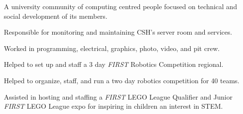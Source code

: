 \cvtag{\LaTeX}



\medskip
{}
A university community of computing centred people focused on technical and social development of its members.

Responsible for monitoring and maintaining CSH's server room and services.

\divider

Worked in programming, electrical, graphics, photo, video, and pit crew.








\divider

Helped to set up and staff a 3 day \textit{FIRST} Robotics Competition regional.

Helped to organize, staff, and run a two day robotics competition for 40 teams.

Assisted in hosting and staffing a \textit{FIRST} LEGO\textsuperscript{\textregistered} League Qualifier and Junior \textit{FIRST} LEGO League expo for inspiring in children an interest in STEM.


